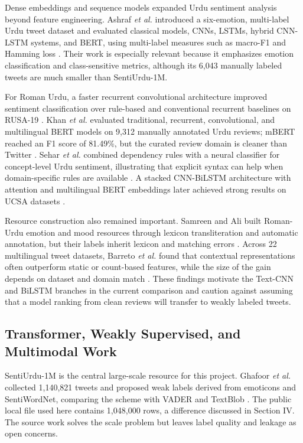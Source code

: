 \documentclass[conference]{IEEEtran}
\begin{document}
Dense embeddings and sequence models expanded Urdu sentiment analysis beyond feature engineering. Ashraf \emph{et al.} introduced a six-emotion, multi-label Urdu tweet dataset and evaluated classical models, CNNs, LSTMs, hybrid CNN-LSTM systems, and BERT, using multi-label measures such as macro-F1 and Hamming loss \cite{ashraf2022multilabel}. Their work is especially relevant because it emphasizes emotion classification and class-sensitive metrics, although its 6,043 manually labeled tweets are much smaller than SentiUrdu-1M.

For Roman Urdu, a faster recurrent convolutional architecture improved sentiment classification over rule-based and conventional recurrent baselines on RUSA-19 \cite{nagra2022faster}. Khan \emph{et al.} evaluated traditional, recurrent, convolutional, and multilingual BERT models on 9,312 manually annotated Urdu reviews; mBERT reached an F1 score of 81.49\%, but the curated review domain is cleaner than Twitter \cite{khan2022multiclass}. Sehar \emph{et al.} combined dependency rules with a neural classifier for concept-level Urdu sentiment, illustrating that explicit syntax can help when domain-specific rules are available \cite{sehar2023hybrid}. A stacked CNN-BiLSTM architecture with attention and multilingual BERT embeddings later achieved strong results on UCSA datasets \cite{khan2025empowering}.

Resource construction also remained important. Samreen and Ali built Roman-Urdu emotion and mood resources through lexicon transliteration and automatic annotation, but their labels inherit lexicon and matching errors \cite{samreen2024dataset}. Across 22 multilingual tweet datasets, Barreto \emph{et al.} found that contextual representations often outperform static or count-based features, while the size of the gain depends on dataset and domain match \cite{barreto2023assessment}. These findings motivate the Text-CNN and BiLSTM branches in the current comparison and caution against assuming that a model ranking from clean reviews will transfer to weakly labeled tweets.

\subsection{Transformer, Weakly Supervised, and Multimodal Work}

SentiUrdu-1M is the central large-scale resource for this project. Ghafoor \emph{et al.} collected 1,140,821 tweets and proposed weak labels derived from emoticons and SentiWordNet, comparing the scheme with VADER and TextBlob \cite{ghafoor2023sentiurdu}. The public local file used here contains 1,048,000 rows, a difference discussed in Section IV. The source work solves the scale problem but leaves label quality and leakage as open concerns.
\end{document}
